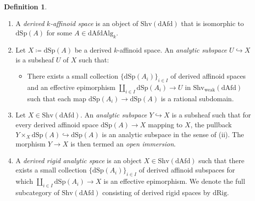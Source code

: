 \documentclass[oneside, hidelinks, 12pt, a4paper,reqno]{amsart}
\theoremstyle{plain}
\theoremstyle{definition}
\newtheorem{definition}[definition]{Definition}
\theoremstyle{plain}
\begin{document}
\begin{definition}\cite[Definition 4.19]{soor2025sixfunctorformalismquasicoherentsheaves}\label{def: derived rigid variety}
\leavevmode
\begin{enumerate}
    \item[(i)] A \emph{derived $k$-affinoid space} is an object of $\mathrm{Shv}(\mathrm{dAfd})$ that is isomorphic to $\mathrm{dSp}(A)$ for some $A \in \mathrm{dAfdAlg}_{k}$.
    
    \item[(ii)] Let $X \coloneqq \mathrm{dSp}(A)$ be a derived $k$-affinoid space. An \emph{analytic subspace} $U \hookrightarrow X$ is a subsheaf $U$ of $X$ such that:
    \begin{itemize}
        \item[$\star$] There exists a small collection $\{\mathrm{dSp}(A_i)\}_{i \in I}$ of derived affinoid spaces and an effective epimorphism $\coprod_{i \in I} \mathrm{dSp}(A_i) \to U$ in $\mathrm{Shv}_{\mathrm{weak}}(\mathrm{dAfd})$ such that each map $\mathrm{dSp}(A_i) \to \mathrm{dSp}(A)$ is a rational subdomain.
    \end{itemize}

    \item[(iii)] Let $X \in \mathrm{Shv}(\mathrm{dAfd})$. An \emph{analytic subspace} $Y \hookrightarrow X$ is a subsheaf such that for every derived affinoid space $\mathrm{dSp}(A) \to X$ mapping to $X$, the pullback $Y \times_X \mathrm{dSp}(A) \hookrightarrow \mathrm{dSp}(A)$ is an analytic subspace in the sense of (ii). The morphism $Y \to X$ is then termed an \emph{open immersion}.

    \item[(iv)] A \emph{derived rigid analytic space} is an object $X \in \mathrm{Shv}(\mathrm{dAfd})$ such that there exists a small collection $\{\mathrm{dSp}(A_i)\}_{i \in I}$ of derived affinoid subspaces for which $\coprod_{i \in I} \mathrm{dSp}(A_i) \to X$ is an effective epimorphism. We denote the full subcategory of $\mathrm{Shv}(\mathrm{dAfd})$ consisting of derived rigid spaces by $\mathrm{dRig}$.
\end{enumerate}
\end{definition}
\end{document}
